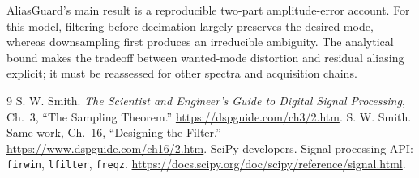 \documentclass[10pt,a4paper]{article}
\begin{document}
AliasGuard's main result is a reproducible two-part amplitude-error account.
For this model, filtering before decimation largely preserves the desired mode,
whereas downsampling first produces an irreducible ambiguity. The analytical
bound makes the tradeoff between wanted-mode distortion and residual aliasing
explicit; it must be reassessed for other spectra and acquisition chains.

\begin{thebibliography}{9}\small
{} S. W. Smith. \emph{The Scientist and Engineer's Guide to Digital
Signal Processing}, Ch.~3, ``The Sampling Theorem.''
\url{https://dspguide.com/ch3/2.htm}.
 S. W. Smith. Same work, Ch.~16, ``Designing the Filter.''
\url{https://www.dspguide.com/ch16/2.htm}.
 SciPy developers. Signal processing API: \texttt{firwin},
\texttt{lfilter}, \texttt{freqz}. \url{https://docs.scipy.org/doc/scipy/reference/signal.html}.
\end{thebibliography}
\end{document}
